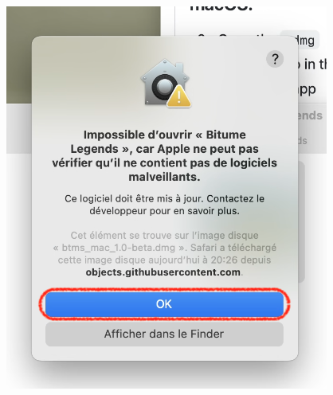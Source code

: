 \documentclass[a4paper,12pt]{article}
\begin{document}
        \begin{center}
            \includegraphics[scale=0.4]{install_mac_error.png}
        \end{center}
    
\end{document}
